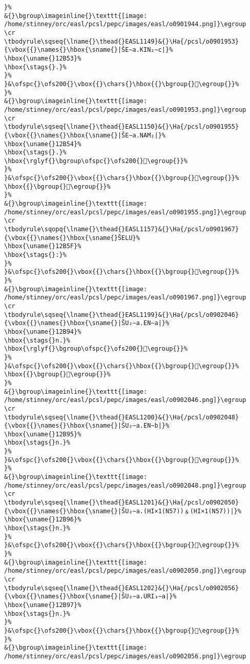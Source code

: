 \begin{verbatim}
}%
&{}\bgroup\imageinline{}\texttt{[image: /home/stinney/orc/easl/pcsl/pepc/images/easl/o0901944.png]}\egroup
\cr
\tbodyrule\sqseq{\lname{}\thead{}EASL1149}&{}\Ha{/pcsl/o0901953}{\vbox{{}\names{}\hbox{\sname{}|ŠE∼a.KIN₂∼c|}%
\hbox{\uname{}12B53}%
\hbox{\stags{}.}%
}%
}&\ofspc{}\ofs200{}\vbox{{}\chars{}\hbox{{}\bgroup{}𒭓\egroup{}}%
}%
&{}\bgroup\imageinline{}\texttt{[image: /home/stinney/orc/easl/pcsl/pepc/images/easl/o0901953.png]}\egroup
\cr
\tbodyrule\sqseq{\lname{}\thead{}EASL1150}&{}\Ha{/pcsl/o0901955}{\vbox{{}\names{}\hbox{\sname{}|ŠE∼a.NAM₂|}%
\hbox{\uname{}12B54}%
\hbox{\stags{}.}%
\hbox{\rglyf{}\bgroup\ofspc{}\ofs200{}𒭔\egroup{}}%
}%
}&\ofspc{}\ofs200{}\vbox{{}\chars{}\hbox{{}\bgroup{}𒭔\egroup{}}%
\hbox{{}\bgroup{}𒭕\egroup{}}%
}%
&{}\bgroup\imageinline{}\texttt{[image: /home/stinney/orc/easl/pcsl/pepc/images/easl/o0901955.png]}\egroup
\cr
\tbodyrule\sqopq{\lname{}\thead{}EASL1157}&{}\Ha{/pcsl/o0901967}{\vbox{{}\names{}\hbox{\sname{}ŠELU}%
\hbox{\uname{}12B5F}%
\hbox{\stags{}:}%
}%
}&\ofspc{}\ofs200{}\vbox{{}\chars{}\hbox{{}\bgroup{}𒭟\egroup{}}%
}%
&{}\bgroup\imageinline{}\texttt{[image: /home/stinney/orc/easl/pcsl/pepc/images/easl/o0901967.png]}\egroup
\cr
\tbodyrule\sqseq{\lname{}\thead{}EASL1199}&{}\Ha{/pcsl/o0902046}{\vbox{{}\names{}\hbox{\sname{}|ŠU₂∼a.EN∼a|}%
\hbox{\uname{}12B94}%
\hbox{\stags{}n.}%
\hbox{\rglyf{}\bgroup\ofspc{}\ofs200{}𒮔\egroup{}}%
}%
}&\ofspc{}\ofs200{}\vbox{{}\chars{}\hbox{{}\bgroup{}𒮓\egroup{}}%
\hbox{{}\bgroup{}𒮔\egroup{}}%
}%
&{}\bgroup\imageinline{}\texttt{[image: /home/stinney/orc/easl/pcsl/pepc/images/easl/o0902046.png]}\egroup
\cr
\tbodyrule\sqseq{\lname{}\thead{}EASL1200}&{}\Ha{/pcsl/o0902048}{\vbox{{}\names{}\hbox{\sname{}|ŠU₂∼a.EN∼b|}%
\hbox{\uname{}12B95}%
\hbox{\stags{}n.}%
}%
}&\ofspc{}\ofs200{}\vbox{{}\chars{}\hbox{{}\bgroup{}𒮕\egroup{}}%
}%
&{}\bgroup\imageinline{}\texttt{[image: /home/stinney/orc/easl/pcsl/pepc/images/easl/o0902048.png]}\egroup
\cr
\tbodyrule\sqseq{\lname{}\thead{}EASL1201}&{}\Ha{/pcsl/o0902050}{\vbox{{}\names{}\hbox{\sname{}|ŠU₂∼a.(HI×1(N57))﹠(HI×1(N57))|}%
\hbox{\uname{}12B96}%
\hbox{\stags{}n.}%
}%
}&\ofspc{}\ofs200{}\vbox{{}\chars{}\hbox{{}\bgroup{}𒮖\egroup{}}%
}%
&{}\bgroup\imageinline{}\texttt{[image: /home/stinney/orc/easl/pcsl/pepc/images/easl/o0902050.png]}\egroup
\cr
\tbodyrule\sqseq{\lname{}\thead{}EASL1202}&{}\Ha{/pcsl/o0902056}{\vbox{{}\names{}\hbox{\sname{}|ŠU₂∼a.URI₃∼a|}%
\hbox{\uname{}12B97}%
\hbox{\stags{}n.}%
}%
}&\ofspc{}\ofs200{}\vbox{{}\chars{}\hbox{{}\bgroup{}𒮗\egroup{}}%
}%
&{}\bgroup\imageinline{}\texttt{[image: /home/stinney/orc/easl/pcsl/pepc/images/easl/o0902056.png]}\egroup

\end{verbatim}
